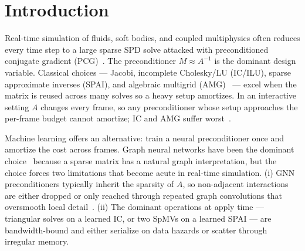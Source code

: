 \documentclass[acmtog]{acmart}
\theoremstyle{plain}
\begin{document}
\maketitle
\thispagestyle{plain}

\section{Introduction}
\label{sec:intro}

Real-time simulation of fluids, soft bodies, and coupled multiphysics often reduces
every time step to a large sparse SPD solve attacked with preconditioned conjugate
gradient (PCG)~\cite{saad2003iterative}. The preconditioner $M\!\approx\!A^{-1}$ is the
dominant design variable. Classical choices --- Jacobi, incomplete Cholesky/LU
(IC/ILU), sparse approximate inverses (SPAI), and algebraic multigrid
(AMG)~\cite{lin1999incomplete,kolotilina1993factorized,benzi1996sparse,ruge1987algebraic}
--- excel when the matrix is reused across many solves so a heavy setup amortizes. In
an interactive setting $A$ changes every frame, so any preconditioner whose setup
approaches the per-frame budget cannot amortize; IC and AMG suffer
worst~\cite{naumov2015amgx,liu2016synchronization,yamazaki2020performance}.

Machine learning offers an alternative: train a neural preconditioner once and amortize
the cost across frames. Graph neural networks have been the dominant
choice~\cite{Li2023learning,hausner2023neural,chen2024gnp,Yang2025sparse} because a
sparse matrix has a natural graph interpretation, but the choice forces two limitations
that become acute in real-time simulation. (i) GNN preconditioners typically inherit
the sparsity of $A$, so non-adjacent interactions are either dropped or only reached
through repeated graph convolutions that oversmooth local
detail~\cite{chen2020simple,trifonov2025gnn}. (ii) The dominant operations at apply
time --- triangular solves on a learned IC, or two SpMVs on a learned SPAI --- are
bandwidth-bound and either serialize on data hazards or scatter through irregular
memory.
\end{document}
